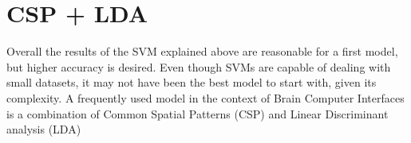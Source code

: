 \section{CSP + LDA}
Overall the results of the SVM explained above are reasonable for a first model, but higher accuracy is desired. Even though SVMs are capable of dealing with small datasets, it may not have been the best model to start with, given its complexity. A frequently used model in the context of Brain Computer Interfaces is a combination of Common Spatial Patterns (CSP) and Linear Discriminant analysis (LDA)  \cite{}%





